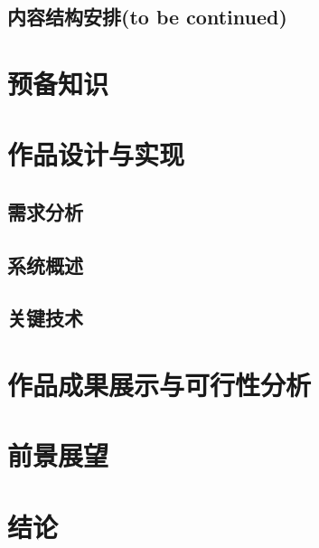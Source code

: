 \documentclass[zihao=-4]{ctexart}
\begin{document}
\subsection{内容结构安排(to be continued)}

\section{预备知识}


\section{作品设计与实现}
\subsection{需求分析}
\subsection{系统概述}
\subsection{关键技术}

\section{作品成果展示与可行性分析}

\section{前景展望}

\section{结论}
\end{document}
